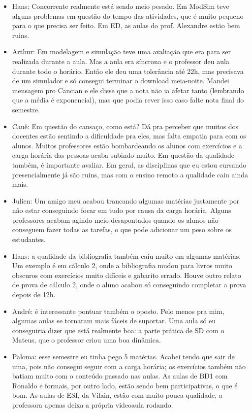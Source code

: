 \documentclass{ata-calico}
\begin{document}
\begin{itemize}
\item Hans: Concorrente realmente está sendo meio pesado. Em ModSim teve alguns problemas em questão do tempo das atividades, que é muito pequeno para o que precisa ser feito. Em ED, as aulas do prof. Alexandre estão bem ruins.
\item Arthur: Em modelagem e simulação teve uma avaliação que era para ser realizada durante a aula. Mas a aula era síncrona e o professor deu aula durante todo o horário. Então ele deu uma tolerância até 22h, mas precisava de um simulador e só consegui terminar o download meia-noite. Mandei mensagem pro Cancian e ele disse que a nota não ia afetar tanto (lembrando que a média é exponencial), mas que podia rever isso caso falte nota final do semestre.
\item Cauê: Em questão do cansaço, como está? Dá pra perceber que muitos dos docentes estão sentindo a dificuldade pra eles, mas falta empatia para com os alunos. Muitos professores estão bombardeando os alunos com exercícios e a carga horária das pessoas acaba subindo muito. Em questão da qualidade também, é importante avaliar. Em geral, as disciplinas que eu estou cursando presencialmente já são ruins, mas com o ensino remoto a qualidade caiu ainda mais.
\item Julien: Um amigo meu acabou trancando algumas matérias justamente por não estar conseguindo focar em tudo por causa da carga horária. Alguns professores acabam agindo meio desapontados quando os alunos não conseguem fazer todas as tarefas, o que pode adicionar um peso sobre os estudantes.
\item Hans: a qualidade da bibliografia também caiu muito em algumas matérias. Um exemplo é em cálculo 2, onde a bibliografia mudou para livros muito obscuros com exercícios muito difíceis e gabarito errado. Houve outro relato de prova de cálculo 2, onde o aluno acabou só conseguindo completar a prova depois de 12h.
\item André: é interessante pontuar também o oposto. Pelo menos pra mim, algumas aulas se tornaram mais fáceis de suportar. Uma aula só eu conseguiria dizer que está realmente boa: a parte prática de SD com o Mateus, que o professor criou uma boa dinâmica.
\item Paloma: esse semestre eu tinha pego 5 matérias. Acabei tendo que sair de uma, pois não consegui seguir com a carga horária; os exercícios também não batiam muito com o conteúdo passado nas aulas. As aulas de BD1 com Ronaldo e formais, por outro lado, estão sendo bem participativas, o que é bom. As aulas de ESI, da Vilain, estão com muito pouca qualidade, a professora apenas deixa a própria videoaula rodando.
\end{itemize}

\end{document}
